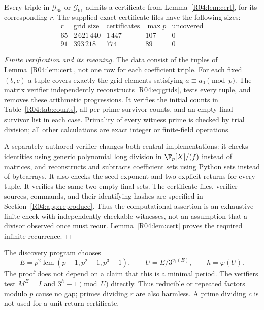 \documentclass[11pt,a4paper]{article}
\theoremstyle{definition}\newtheorem{definition}[theorem]{Definition}
\theoremstyle{remark}\newtheorem{remark}[theorem]{Remark}
\DeclareMathOperator{\lcm}{lcm}\DeclareMathOperator{\disc}{disc}\DeclareMathOperator{\Res}{Res}
\begin{document}
\begin{proposition}\label{R04:prop:cover}
Every triple in $\mathcal G_{65}$ or $\mathcal G_{91}$ admits a
certificate from Lemma~\ref{R04:lem:cert}, for its corresponding $r$.
The supplied exact certificate files have the following sizes:
\[
\begin{array}{c|r|r|r|r}
 r&\text{grid size}&\text{certificates}&\max p&\text{uncovered}\\\hline
 65&2\,621\,440&1\,447&107&0\\
 91&393\,218&774&89&0
\end{array}
\]
\end{proposition}
\begin{proof}[Finite verification and its meaning]
The data consist of the tuples of Lemma~\ref{R04:lem:cert}, not one row
for each coefficient triple. For each fixed $(b,c)$ a tuple covers
exactly the grid elements satisfying $a\equiv a_0\pmod p$.
The matrix verifier independently reconstructs \eqref{R04:eq:grids},
tests every tuple, and removes these arithmetic progressions.
It verifies the initial counts in Table~\ref{R04:tab:counts}, all
per-prime survivor counts, and an empty final survivor list in each
case. Primality of every witness prime is checked by trial division;
all other calculations are exact integer or finite-field operations.

A separately authored verifier changes both central implementations:
it checks identities using generic polynomial long division in
$\F_p[X]/(f)$ instead of matrices, and reconstructs and subtracts
coefficient sets using Python sets instead of bytearrays. It also
checks the seed exponent and two explicit returns for every tuple.
It verifies the same two empty final sets. The certificate files,
verifier sources, commands, and their identifying hashes are specified
in Section~\ref{R04:app:reproduce}. Thus the computational assertion is
an exhaustive finite check with independently checkable witnesses,
not an assumption that a divisor observed once must recur.
Lemma~\ref{R04:lem:cert} proves the required infinite recurrence.
\end{proof}

The discovery program chooses
\begin{equation}\label{R04:eq:E}
 E=p^2\lcm(p-1,p^2-1,p^3-1),\qquad
 U=E/3^{v_3(E)},\qquad h=\varphi(U).
\end{equation}
The proof does not depend on a claim that this is a minimal period.
The verifiers test $M^E=I$ and $3^h\equiv1\pmod U$ directly.
Thus reducible or repeated factors modulo $p$ cause no gap; primes
dividing $r$ are also harmless. A prime dividing $c$ is not used for
a unit-return certificate.
\end{document}
